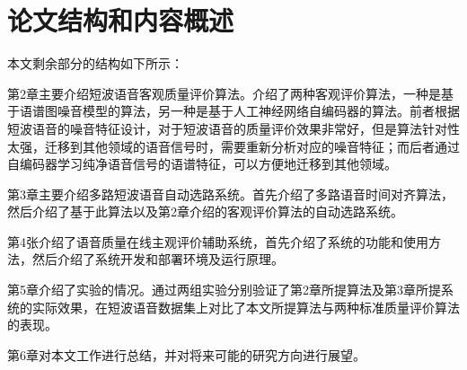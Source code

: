 \section{论文结构和内容概述}

本文剩余部分的结构如下所示：

第2章主要介绍短波语音客观质量评价算法。介绍了两种客观评价算法，一种是基于语谱图噪音模型的算法，另一种是基于人工神经网络自编码器的算法。前者根据短波语音的噪音特征设计，对于短波语音的质量评价效果非常好，但是算法针对性太强，迁移到其他领域的语音信号时，需要重新分析对应的噪音特征；而后者通过自编码器学习纯净语音信号的语谱特征，可以方便地迁移到其他领域。

第3章主要介绍多路短波语音自动选路系统。首先介绍了多路语音时间对齐算法，然后介绍了基于此算法以及第2章介绍的客观评价算法的自动选路系统。

第4张介绍了语音质量在线主观评价辅助系统，首先介绍了系统的功能和使用方法，然后介绍了系统开发和部署环境及运行原理。

第5章介绍了实验的情况。通过两组实验分别验证了第2章所提算法及第3章所提系统的实际效果，在短波语音数据集上对比了本文所提算法与两种标准质量评价算法的表现。

第6章对本文工作进行总结，并对将来可能的研究方向进行展望。


